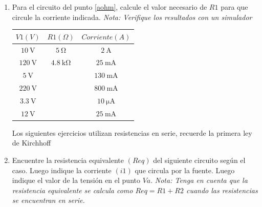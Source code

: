 \documentclass{article}
\begin{document}
\begin{enumerate}[label=\textbf{A.\arabic*}]
		\begin{tabular}{|c|c|c|}
			\hline
			\rowcolor{headergray}
		${V1 (V)}$& ${R1(\Omega)}$& ${Corriente(A)}$\\ \hline
		$\SI{10}{\volt}$& $\SI{1}{\ohm}$& $\SI{10}{\ampere}$ \\ \hline
		$\SI{12}{\volt}$& $\SI{1}{\kilo\ohm}$& $\SI{12}{\milli\ampere}$ \\ \hline
		$\SI{5}{\volt}$&$\SI{4,7}{\kilo\ohm}$ & \\ \hline
		$\SI{220}{\volt}$&$\SI{1}{\mega\ohm}$& \\ \hline
		$\SI{3,3}{\volt}$&$\SI{165}{\ohm}$& \\ \hline
		$\SI{9}{\volt}$&$\SI{360}{\ohm}$& \\ \hline
		$\SI{12}{\volt}$&$\SI{12}{\ohm}$& \\ \hline
	\end{tabular}
	\item Para el circuito del punto \ref{aohm}, calcule el valor necesario de $R1$ para que circule la corriente indicada. \textit{Nota: Verifique los resultados con un simulador}\\
		\begin{tabular}{|c|c|c|}
			\hline
			\rowcolor{headergray}
			${V1 (V)}$& ${R1(\Omega)}$& ${Corriente(A)}$\\ \hline
			$\SI{10}{\volt}$& $\SI{5}{\ohm}$& $\SI{2}{\ampere}$  \\ \hline
			$\SI{120}{\volt}$& $\SI{4.8}{\kilo\ohm}$& $\SI{25}{\milli\ampere}$  \\ \hline
			$\SI{5}{\volt}$& & $\SI{130}{\milli\ampere}$ \\ \hline
			$\SI{220}{\volt}$&&$\SI{800}{\milli\ampere}$ \\ \hline
			$\SI{3,3}{\volt}$&&$\SI{10}{\micro\ampere}$ \\ \hline
			$\SI{12}{\volt}$&&$\SI{25}{\milli\ampere}$ \\ \hline
		\end{tabular}
\begin{tcolorbox}[enhanced,attach boxed title to top center={yshift=-3mm,yshifttext=-1mm},
	colback=black!5!white,colframe=white!75!black,colbacktitle=red!80!black,
	title= Atención , fonttitle=\bfseries,
	boxed title style={size=small,colframe=white,colback=black} ]
	Los siguientes ejercicios utilizan resistencias en serie, recuerde la primera ley de Kirchhoff
\end{tcolorbox}
	\item  \label{a11}
	Encuentre la resistencia equivalente 	${(Req)}$ del siguiente circuito según el caso. Luego indique la corriente 	${(i1)}$ que circula por la fuente. Luego indique el valor de la tensión en el punto ${Va}$. \textit{Nota:
	Tenga en cuenta que la resistencia equivalente se calcula como ${Req=R1+R2}$ cuando las resistencias se encuentran en serie.}\\
	\begin{minipage}{.60\textwidth}
			

\end{minipage}
\end{enumerate}
\end{document}
